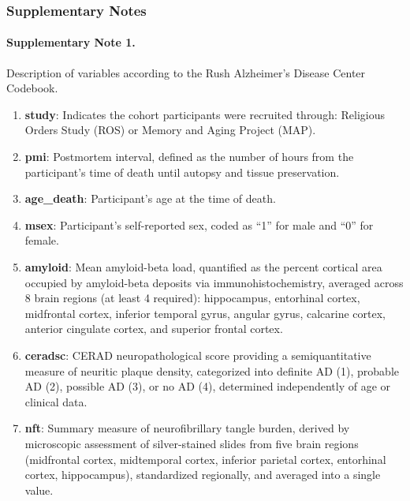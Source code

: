 \subsubsection*{Supplementary Notes}
{}

\paragraph*{Supplementary Note 1.}
{}
Description of variables according to the Rush Alzheimer’s Disease Center Codebook.
\begin{enumerate}
    \item \textbf{study}: Indicates the cohort participants were recruited through: Religious Orders Study (ROS) or Memory and Aging Project (MAP)\supercite{Bennett2018-tn}.
    
    \item \textbf{pmi}: Postmortem interval, defined as the number of hours from the participant’s time of death until autopsy and tissue preservation.
    
    \item \textbf{age\_death}: Participant's age at the time of death.
    
    \item \textbf{msex}: Participant's self-reported sex, coded as “1” for male and “0” for female.
    
    \item \textbf{amyloid}: Mean amyloid-beta load, quantified as the percent cortical area occupied by amyloid-beta deposits via immunohistochemistry, averaged across 8 brain regions (at least 4 required): hippocampus, entorhinal cortex, midfrontal cortex, inferior temporal gyrus, angular gyrus, calcarine cortex, anterior cingulate cortex, and superior frontal cortex.
    
    \item \textbf{ceradsc}: CERAD neuropathological score providing a semiquantitative measure of neuritic plaque density, categorized into definite AD (1), probable AD (2), possible AD (3), or no AD (4), determined independently of age or clinical data.
    
    \item \textbf{nft}: Summary measure of neurofibrillary tangle burden, derived by microscopic assessment of silver-stained slides from five brain regions (midfrontal cortex, midtemporal cortex, inferior parietal cortex, entorhinal cortex, hippocampus), standardized regionally, and averaged into a single value.
    

\end{enumerate}
